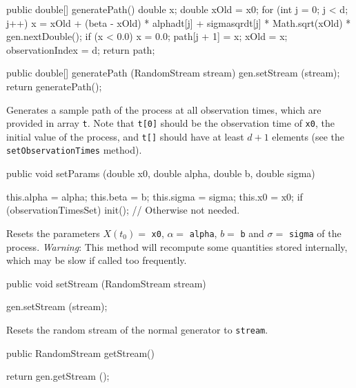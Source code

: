 \begin{hide}\begin{code}

   public double[] generatePath() {
      double x;
      double xOld = x0;
      for (int j = 0; j < d; j++) {
          x = xOld + (beta - xOld) * alphadt[j]
              + sigmasqrdt[j] * Math.sqrt(xOld) * gen.nextDouble();
          if (x < 0.0)
              x = 0.0;
          path[j + 1] = x;
          xOld = x;
      }
      observationIndex = d;
      return path;
   }

   public double[] generatePath (RandomStream stream) {
        gen.setStream (stream);
        return generatePath();
   }
\end{code}
\begin{tabb} Generates a sample path of the process at all observation times,
 which are provided in array \texttt{t}.
 Note that \texttt{t[0]} should be the observation time of \texttt{x0},
 the initial value of the process, and \texttt{t[]} should have at least $d+1$
 elements (see the \texttt{setObservationTimes} method).
\end{tabb}\end{hide}
\begin{code}

   public void setParams (double x0, double alpha, double b, double sigma) \begin{hide} {
      this.alpha = alpha;
      this.beta  = b;
      this.sigma = sigma;
      this.x0    = x0;
      if (observationTimesSet) init(); // Otherwise not needed.
   }\end{hide}
\end{code}
\begin{tabb}
Resets the parameters $X(t_{0}) =$ \texttt{x0}, $\alpha =$ \texttt{alpha},
 $b =$ \texttt{b} and $\sigma =$ \texttt{sigma} of the process.
\emph{Warning}: This method will recompute some quantities stored internally,
which may be slow if called too frequently.
\end{tabb}
\begin{code}

   public void setStream (RandomStream stream) \begin{hide} {
      gen.setStream (stream);
   }\end{hide}
\end{code}
\begin{tabb}
Resets the random stream of the normal generator to \texttt{stream}.
\end{tabb}
\begin{code}

   public RandomStream getStream() \begin{hide} {
      return gen.getStream ();
   }\end{hide}
\end{code}
